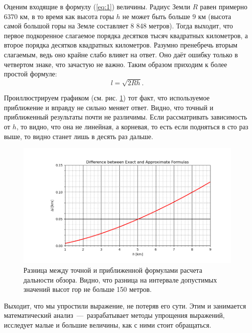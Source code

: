 \documentclass[12pt]{article}
\begin{document}
\par
Оценим входящие в формулу (\ref{eq:1}) величины. Радиус Земли $R$ равен примерно $6 370$ км, в то время как высота горы $h$ не может быть больше $9$ км (высота самой большой горы на Земле составляет 8 848 метров). Тогда выходит, что первое подкоренное слагаемое порядка десятков тысяч квадратных километров, а второе порядка десятков квадратных километров. Разумно пренебречь вторым слагаемым, ведь оно крайне слабо влияет на ответ. Оно даёт ошибку только в четвертом знаке, что зачастую не важно. Таким образом приходим к более простой формуле:
\begin{equation}
 l = \sqrt{2Rh}.
\end{equation}

Проиллюстрируем графиком (см. рис. \ref{fig:2}) тот факт, что используемое приближение и вправду не сильно меняет ответ. Видно, что точный и приближенный результаты почти не различимы. Если рассматривать зависимость от $h$, то видно, что она не линейная, а корневая, то есть если подняться в сто раз выше, то видно станет лишь в десять раз дальше.

\begin{figure}[htb]
 \centering
 \includegraphics[width=\textwidth]{1.png}
 \caption{ Разница между точной и приближенной формулами расчета дальности обзора. Видно, что разница на интервале допустимых значений высот гор не больше 150 метров.}
 \label{fig:2}
\end{figure}

\par
Выходит, что мы упростили выражение, не потеряв его сути. Этим и занимается математический анализ~\----~разрабатывает методы упрощения выражений, исследует малые и большие величины, как с ними стоит обращаться.
\end{document}
